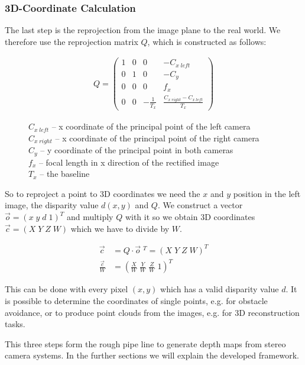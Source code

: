 \documentclass[11pt]{article}
\begin{document}
\subsubsection{3D-Coordinate Calculation}
The last step is the reprojection from the image plane to the real world. We therefore use the reprojection matrix $Q$, which is constructed as follows:

\begin{figure}[H]
\centering
\begin{align*}
Q=
\begin{pmatrix}
1 & 0 & 0 & -C_{x\;left} \\
0 & 1 & 0 & -C_{y} \\
0 & 0 & 0 & f_x \\
0 & 0 & -\frac{1}{T_x} & \frac{C_{x\;right}-C_{x\;left}}{T_x}
\end{pmatrix}
\end{align*}
\captionsetup{justification=justified,margin=1cm}
\caption*{
 $C_{x\;left}$ -- x coordinate of the principal point of the left camera\\
 $C_{x\;right}$ -- x coordinate of the principal point of the right camera\\
 $C_{y}$ -- y coordinate of the principal point in both cameras\\
 $f_x$ -- focal length in x direction of the rectified image\\
 $T_x$ -- the baseline}
\end{figure}



So to reproject a point to 3D coordinates we need the $x$ and $y$ position in the left image, the disparity value $d(x,y)$ and $Q$. We construct a vector $\vec{o}=(x\;y\;d\;1)^T$ and multiply $Q$ with it so we obtain 3D coordinates $\vec{c}=(X\;Y\;Z\;W)$ which we have to divide by $W$.

\begin{align*}
	\vec{c}&=Q\cdot \vec{o}\;^T = (X\;Y\;Z\;W)^T\\
	\frac{\vec{c}}{W}&=\left(\frac{X}{W}\;\frac{Y}{W}\;\frac{Z}{W}\;1\right)^T
\end{align*}

This can be done with every pixel $(x,y)$ which has a valid disparity value $d$. It is possible to determine the coordinates of single points, e.g. for obstacle avoidance, or to produce point clouds from the images, e.g. for 3D reconstruction tasks.


\bigskip This three steps form the rough pipe line to generate depth maps from stereo camera systems. In the further sections we will explain the developed framework.
\end{document}
